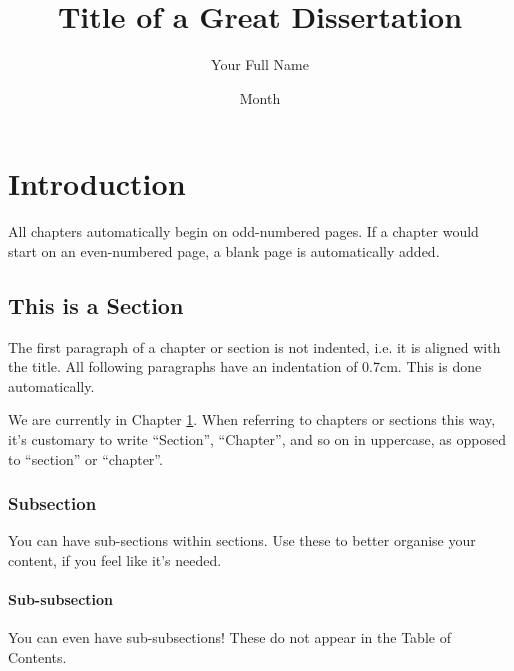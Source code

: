 \documentclass[12pt,reqno,twoside]{amsbook}
\title{Title of a Great Dissertation}
\author{Your Full Name}
\date{Month}{Year}
\begin{document}
\chapter{Introduction}\label{ch:introduction}
All chapters automatically begin on odd-numbered pages. If a chapter would start on an even-numbered page, a blank page is automatically added.

\section{This is a Section}\label{sec:example_section}
The first paragraph of a chapter or section is not indented, i.e. it is aligned with the title. All following paragraphs have an indentation of 0.7cm. This is done automatically.

We are currently in Chapter \ref{ch:introduction}. When referring to chapters or sections this way, it's customary to write ``Section'', ``Chapter'', and so on in uppercase, as opposed to ``section'' or ``chapter''.

\subsection{Subsection}
You can have sub-sections within sections. Use these to better organise your content, if you feel like it's needed.

\subsubsection{Sub-subsection}
You can even have sub-subsections! These do not appear in the Table of Contents.
\end{document}
